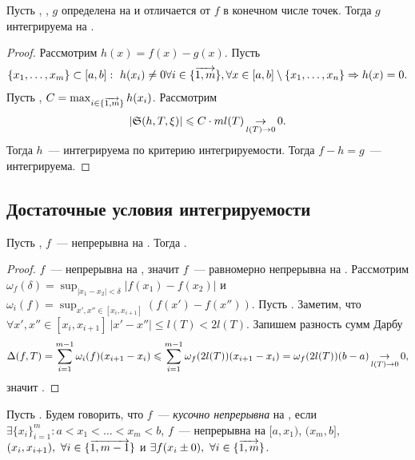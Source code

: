 \documentclass[../main.tex]{subfiles}
\begin{document}
\begin{proposition}
    Пусть \fabr, \fintonab, $g$ определена на \segab\space и отличается от $f$ в конечном числе точек. Тогда $g$ интегрируема на \segab.
\end{proposition}

\begin{proof}
    Рассмотрим $h(x) = f(x) - g(x)$. Пусть 
    \begin{gather*}
        \{x_1, \ldots, x_m\} \subset [a,b] :\ h(x_i) \neq 0 \forall {i \in\{\overrightarrow{1,m}\}}, \forall x \in [a,b] \setminus \{x_1, \ldots, x_n\} \Rightarrow h(x) = 0.
    \end{gather*}
    Пусть \tpab, $C = \max_{{i \in\{\overrightarrow{1,m}\}}} h(x_i)$. Рассмотрим 
    \begin{gather}
        |\mathfrak{S}(h, T, \xi)| \leqslant C \cdot m l(T) \operatorname*{\to}_{l(T) \to 0} 0.
    \end{gather}
    Тогда $h$~--- интегрируема по критерию интегрируемости. Тогда $f-h = g$~--- интегрируема.
\end{proof}

\subsection{Достаточные условия интегрируемости}

\begin{proposition}
    Пусть \fabr, $f$~--- непрерывна на \segab. Тогда \fintonab.
\end{proposition}

\begin{proof}
    $f$~--- непрерывна на \segab, значит $f$~--- равномерно непрерывна на \segab. Рассмотрим $\omega_f(\delta) = \sup_{|x_1-x_2| < \delta} |f(x_1) - f(x_2)|$ и $\omega_i(f) = \sup_{x',x'' \in [x_i,x_{i+1}]}(f(x') - f(x''))$.
    Пусть \tpab. Заметим, что $\forall x',x'' \in [x_i,x_{i+1}]\ |x'-x''| \leq l(T) < 2l(T)$. Запишем разность сумм Дарбу
    \begin{gather*}
        \Delta(f, T) = \sum_{i=1}^{m-1} \omega_i(f)(x_{i+1} - x_i) \leqslant \sum_{i=1}^{m-1} \omega_f(2l(T))(x_{i+1} - x_i) = \omega_f(2l(T)) (b-a) \operatorname*{\to}_{l(T)\to0} 0,
    \end{gather*}
    значит \fintonab.
\end{proof}

\begin{definition}
    Пусть \fabr. Будем говорить, что $f$~--- \emph{кусочно непрерывна} на \segab, если $\exists\{x_i\}_{i=1}^{m}: a < x_1 < \ldots < x_m < b$, $f$~--- непрерывна на $[a,x_1)$, $(x_m,b]$, $(x_i, x_{i+1}),\ \forall {i \in\{\overrightarrow{1,m-1}\}}$ и $\exists f(x_i \pm 0),\ \forall {i \in\{\overrightarrow{1,m}\}}$.
\end{definition}
\end{document}
